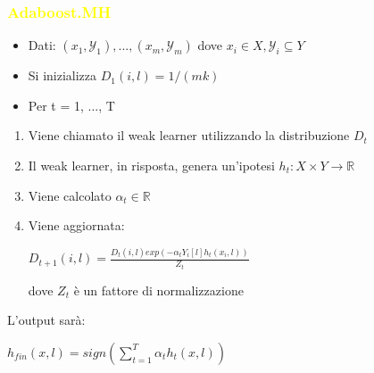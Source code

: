 \documentclass[handout
]{beamer}
\def\yellow#1{{\textcolor{yellow}{#1}}}
\begin{document}
\begin{frame}
\frametitle{\yellow{Adaboost.MH}}
  \begin{itemize}
 \item Dati: \begin{math}
              (x_1,\mathcal{Y}_1), ..., (x_m,\mathcal{Y}_m)
             \end{math} dove \begin{math}
                              x_i \in X, \mathcal{Y}_i \subseteq Y
                             \end{math}
 \item Si inizializza \begin{math}
                       D_1(i,l) = 1/(mk)
                      \end{math}
 \item Per t = 1, ..., T
\end{itemize}

\begin{enumerate}
 \item Viene chiamato il weak learner utilizzando la distribuzione \begin{math}
                                                             D_t
                                                            \end{math}
 \item Il weak learner, in risposta, genera un'ipotesi \begin{math}
                               h_t : X \times Y \rightarrow \mathbb{R}
                              \end{math}
 \item Viene calcolato \begin{math}
                \alpha_t \in \mathbb{R}
               \end{math}
\item Viene aggiornata:


\begin{center}
 \begin{math}
  D_{t+1}(i,l) = \frac{D_t(i,l)exp(-\alpha_t Y_i\left[l\right] h_t (x_i,l))}{Z_t}
 \end{math}
\end{center}
dove \begin{math}
      Z_t
     \end{math} \`e un fattore di normalizzazione
\end{enumerate}
L'output sar\`a:
\begin{center}
 \begin{math}
  h_{fin}(x,l) = sign ( \sum_{t=1}^T \alpha_t h_t (x,l))
 \end{math}

\end{center}
\end{frame}
\end{document}
